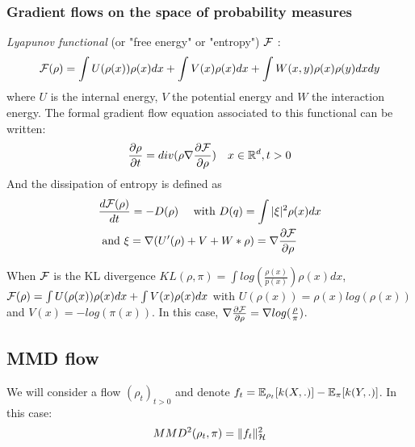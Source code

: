 \subsubsection{Gradient flows on the space of probability measures}

\textit{Lyapunov functional} (or "free energy" or "entropy") ${{\mathcal F}}$  \citep{villani2004trend}:
\begin{equation}
{{\mathcal F}}(\rho)=\int U(\rho(x)) \rho(x)dx + \int V(x)\rho(x)dx + \int W(x,y)\rho(x)\rho(y)dxdy
\end{equation}
where  $U$ is the internal energy, $V$ the potential energy and $W$ the
interaction energy. The formal gradient flow equation associated to this functional can be written:
\begin{equation}
\frac{\partial \rho}{\partial t}= div( \rho \nabla \frac{\partial {{\mathcal F}}}{\partial \rho}) \quad x \in {{\mathbb R}}^d , t>0
\end{equation}
And the dissipation of entropy is defined as %
\begin{align}
&        \frac{d {{\mathcal F}}(\rho)}{dt} =-D(\rho) \quad \text{ with } D(q)= \int |\xi|^2 \rho(x)dx\\
&\text{ and } \xi= \nabla (U'(\rho) + V + W * \rho)= \nabla \frac{\partial {{\mathcal F}}}{\partial \rho}
\end{align}

\begin{remark} When ${{\mathcal F}}$ is the KL divergence $KL(\rho,\pi)=\int log(\frac{\rho(x)}{p(x)})\rho(x)dx$, ${{\mathcal F}}(\rho)=\int U(\rho(x))\rho(x)dx + \int V(x) \rho(x)dx$ with $U(\rho(x))=\rho(x)log(\rho(x))$ and $V(x)=-log(\pi(x))$. In this case, $\nabla \frac{\partial {{\mathcal F}}}{\partial \rho}= \nabla log(\frac{\rho}{\pi})$.
\end{remark}

\subsection{MMD flow}

We will consider a flow $(\rho_t)_{t>0}$ and denote $f_t= {{\mathbb E}}_{\rho_t}[k(X,.)]- {{\mathbb E}}_{\pi}[k(Y,.)]$. In this case:
\begin{equation}
MMD^2(\rho_t,\pi)=\|f_t\|^2_{{{\mathcal H}}}
\end{equation} 

